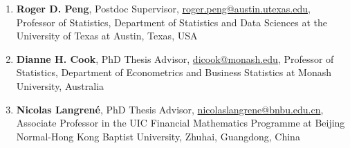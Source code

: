 \documentclass[10pt,a4paper]{article} %
\begin{document}
\begin{enumerate}[itemsep=0.1em]

    \item \textbf{Roger D. Peng}, Postdoc Supervisor, \href{mailto:roger.peng@austin.utexas.edu}{roger.peng@austin.utexas.edu}, Professor of Statistics, Department of Statistics and Data Sciences at the University of Texas at Austin, Texas, USA
    \item \textbf{Dianne H. Cook}, PhD Thesis Advisor, \href{mailto:dicook@monash.edu}{dicook@monash.edu}, Professor of Statistics, Department of Econometrics and Business Statistics at Monash University, Australia
      \item \textbf{Nicolas Langrené}, PhD Thesis Advisor, \href{mailto:nicolaslangrene@bnbu.edu.cn}{nicolaslangrene@bnbu.edu.cn}, Associate Professor in the UIC Financial Mathematics Programme at Beijing Normal-Hong Kong Baptist University, Zhuhai, Guangdong, China
    


\end{enumerate}
\end{document}
